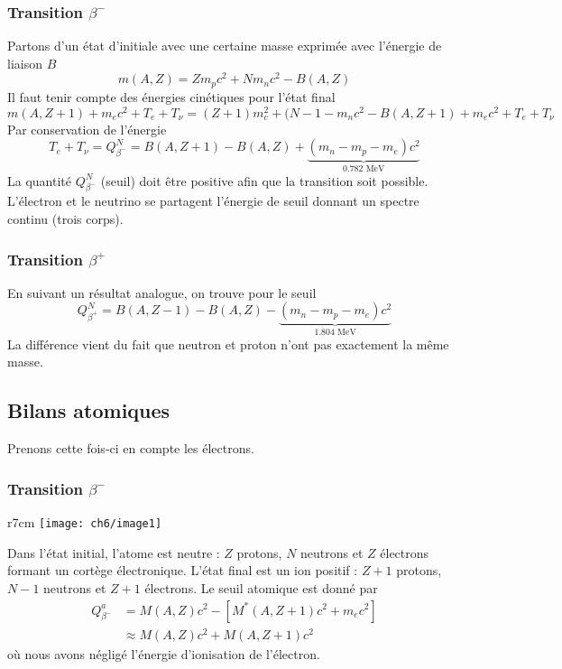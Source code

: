 \subsubsection{Transition $\beta^-$}
Partons d'un état d'initiale avec une certaine masse exprimée avec l'énergie de liaison $B$
\begin{equation}
m(A,Z) = Zm_pc^2 + Nm_nc^2 - B(A,Z)
\end{equation}
Il faut tenir compte des énergies cinétiques pour l'état final 
\begin{equation}
m(A,Z+1) +m_ec^2+T_e+T_\nu = (Z+1)m_c^2+(N-1-m_nc^2-B(A,Z+1)+m_ec^2+T_e+T_\nu
\end{equation}
Par conservation de l'énergie
\begin{equation}
T_e+T_\nu = Q_{\beta^-}^N = B(A,Z+1)-B(A,Z)+\underbrace{(m_n-m_p-m_e)c^2}_{0.782\text{ MeV}}
\end{equation}
La quantité $ Q_{\beta^-}^N$ (seuil) doit être positive afin que la transition soit possible. L'électron et 
le neutrino se partagent l'énergie de seuil donnant un spectre continu (trois corps).


\subsubsection{Transition $\beta^+$}
En suivant un résultat analogue, on trouve pour le seuil
\begin{equation}
Q_{\beta^+}^N = B(A,Z-1)-B(A,Z)-\underbrace{(m_n-m_p-m_e)c^2}_{1.804\text{ MeV}}
\end{equation}
La différence vient du fait que neutron et proton n'ont pas exactement la même masse.


\subsection{Bilans atomiques}
Prenons cette fois-ci en compte les électrons. 

\subsubsection{Transition $\beta^-$}
	\begin{wrapfigure}[9]{r}{7cm}
	\texttt{[image: ch6/image1]}
	\end{wrapfigure}

Dans l'état initial, l'atome est neutre : $Z$ protons, $N$ neutrons et $Z$ électrons formant un cortège 
électronique. L'état final est un ion positif : $Z+1$ protons, $N-1$ neutrons et $Z+1$ électrons. Le seuil 
atomique est donné par
\begin{equation}
\begin{array}{ll}
Q_{\beta^-}^a &= M(A,Z)c^ 2 - [M^*(A,Z+1)c^2+m_ec^2]\\ &\approx M(A,Z)c^2+M(A,Z+1)c^2
\end{array}
\end{equation}
où nous avons négligé l'énergie d'ionisation de l'électron.


